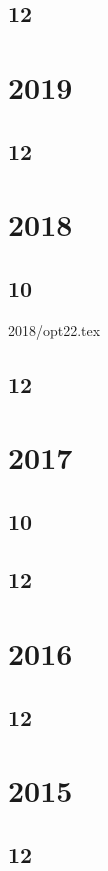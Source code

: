 \documentclass[11pt]{book}
\begin{document}
\subsection{12}

\section{2019}
\subsection{12}




\section{2018}
\subsection{10}
 {2018/opt22.tex}
\subsection{12}




\section{2017}
\subsection{10}

\subsection{12}





\section{2016}
\subsection{12}


\section{2015}
\subsection{12}

\end{document}
